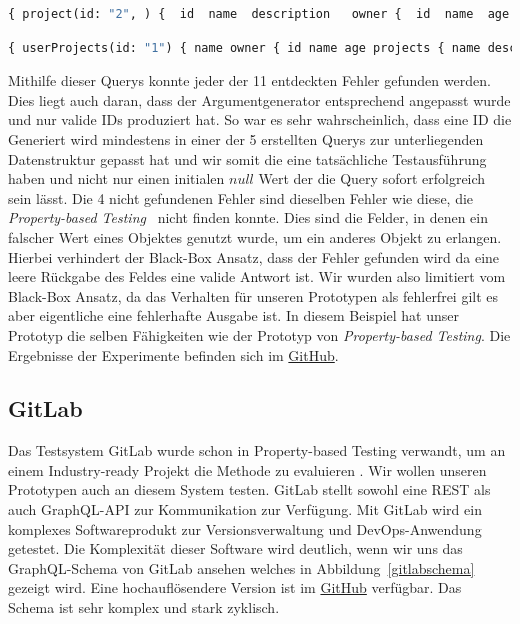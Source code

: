 \begin{lstlisting}[language=GraphQL]
    { project(id: "2", ) {  id  name  description   owner {  id  name  age   }  }  }
\end{lstlisting}

\begin{lstlisting}[language=GraphQL]
    { userProjects(id: "1") { name owner { id name age projects { name description id } } } }
\end{lstlisting}

Mithilfe dieser Querys konnte jeder der 11 entdeckten Fehler gefunden werden.
Dies liegt auch daran, dass der Argumentgenerator entsprechend angepasst wurde und nur valide IDs produziert hat.
So war es sehr wahrscheinlich, dass eine ID die Generiert wird mindestens in einer der 5 erstellten Querys zur unterliegenden Datenstruktur gepasst hat
und wir somit die eine tatsächliche Testausführung haben und nicht nur einen initialen $null$ Wert der die Query sofort erfolgreich sein lässt.
Die 4 nicht gefundenen Fehler sind dieselben Fehler wie diese, die \textit{Property-based Testing}~\cite[vgl. RQ.2]{property-based-testing} nicht finden konnte.
Dies sind die Felder, in denen ein falscher Wert eines Objektes genutzt wurde, um ein anderes Objekt zu erlangen.
Hierbei verhindert der Black-Box Ansatz, dass der Fehler gefunden wird da eine leere Rückgabe des Feldes eine valide Antwort ist.
Wir wurden also limitiert vom Black-Box Ansatz, da das Verhalten für unseren Prototypen als fehlerfrei gilt es aber eigentliche eine fehlerhafte Ausgabe ist.
In diesem  Beispiel hat unser Prototyp die selben Fähigkeiten wie der Prototyp von \textit{Property-based Testing}.
Die Ergebnisse der Experimente befinden sich im \href{https://github.com/gernhard1337/GraphQL-Testautomatisierung/tree/main/experiment/toy-experiment}{GitHub}.

\subsection{GitLab}

Das Testsystem GitLab wurde schon in Property-based  Testing verwandt, um an einem Industry-ready Projekt die Methode zu evaluieren \cite[vgl. Experiment]{property-based-testing}.
Wir wollen unseren Prototypen auch an diesem System testen.
GitLab stellt sowohl eine REST als auch GraphQL-API zur Kommunikation  zur  Verfügung.
Mit GitLab wird ein komplexes Softwareprodukt zur Versionsverwaltung und DevOps-Anwendung getestet.
Die Komplexität dieser Software wird deutlich, wenn wir uns das GraphQL-Schema von GitLab ansehen welches in Abbildung~\ref{gitlabschema} gezeigt wird.
Eine hochauflösendere Version ist im \href{https://github.com/gernhard1337/GraphQL-Testautomatisierung/blob/main/latex/img/gitlabgraph.png}{GitHub} verfügbar.
Das Schema ist sehr komplex und stark zyklisch.

